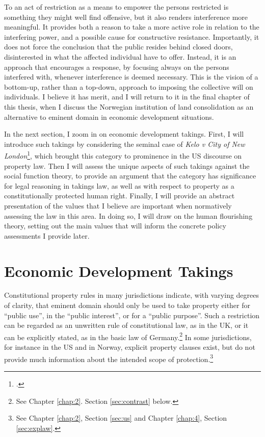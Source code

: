 To  an act of restriction as a means to empower the persons restricted is something they might well find offensive, but it also renders interference more meaningful. It provides both a reason to take a more active role in relation to the interfering power, and a possible cause for constructive resistance. Importantly, it does not force the conclusion that the public resides behind closed doors, disinterested in what the affected individual have to offer. Instead, it is an approach that encourages a response, by focusing always on the persons interfered with, whenever interference is deemed necessary. This is the vision of a bottom-up, rather than a top-down, approach to imposing the collective will on individuals. I believe it has merit, and I will return to it in the final chapter of this thesis, when I discuss the Norwegian institution of land consolidation as an alternative to eminent domain in economic development situations.

In the next section, I zoom in on economic development takings. First, I will introduce such takings by considering the seminal case of {\it Kelo v City of New London}\footcite{kelo05}, which brought this category to prominence in the US discourse on property law. Then I will assess the unique aspects of such takings against the social function theory, to provide an argument that the category has significance for legal reasoning in takings law, as well as with respect to property as a constitutionally protected human right. Finally, I will provide an abstract presentation of the values that I believe are important when normatively assessing the law in this area. In doing so, I will draw on the human flourishing theory, setting out the main values that will inform the concrete policy assessments I provide later. 

\section{Economic Development Takings}\label{sec:edt}

Constitutional property rules in many jurisdictions indicate, with varying degrees of clarity, that eminent domain should only be used to take property either for ``public use'', in the ``public interest'', or for a ``public purpose''. Such a restriction can be regarded as an unwritten rule of constitutional law, as in the UK, or it can be explicitly stated, as in the basic law of Germany.\footnote{See Chapter \ref{chap:2}. Section \ref{sec:contrast} below.} In some jurisdictions, for instance in the US and in Norway, explicit property clauses exist, but do not provide much information about the intended scope of protection.\footnote{See Chapter \ref{chap:2}, Section \ref{sec:us} and Chapter \ref{chap:4}, Section \ref{sec:explaw}.}

